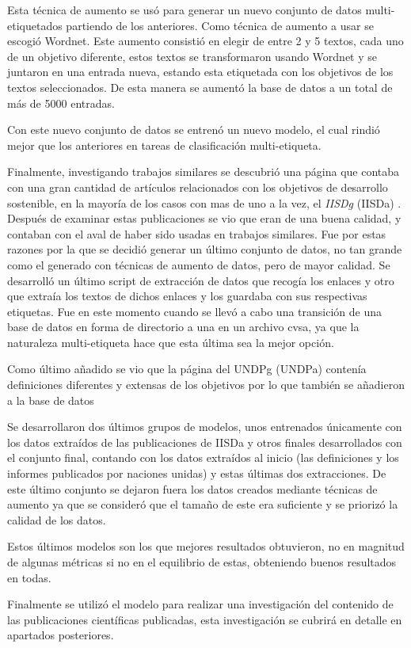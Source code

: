 Esta técnica de aumento se usó para generar un nuevo conjunto de datos
multi-etiquetados partiendo de los anteriores. Como técnica de aumento a usar se
escogió Wordnet. Este aumento consistió en elegir de entre 2 y 5 textos, cada
uno de un objetivo diferente, estos textos se transformaron usando Wordnet y se
juntaron en una entrada nueva, estando esta etiquetada con los objetivos de los
textos seleccionados. De esta manera se aumentó la base de datos a un total de
más de 5000 entradas. 

Con este nuevo conjunto de datos se entrenó un nuevo modelo, el cual rindió mejor que los anteriores en tareas de clasificación multi-etiqueta. 

Finalmente, investigando trabajos similares se descubrió una página que contaba
con una gran cantidad de artículos relacionados con los objetivos de desarrollo
sostenible, en la mayoría de los casos con mas de uno a la vez, el \textit{\gls{IISDg} }(\gls{IISDa})
\cite{IISDHomepage}. Después de examinar estas publicaciones se vio que eran
de una buena calidad, y contaban con el aval de haber sido usadas en trabajos
similares. Fue por estas razones por la que se decidió generar un último
conjunto de datos, no tan grande como el generado con técnicas de aumento de
datos, pero de mayor calidad. Se desarrolló un último script de extracción de
datos que recogía los enlaces y otro que extraía los textos de dichos enlaces y
los guardaba con sus respectivas etiquetas. Fue en este momento cuando se
llevó a cabo una transición de una base de datos en forma de directorio a una en un
archivo \gls{cvsa}, ya que la naturaleza multi-etiqueta hace que esta última sea la
mejor opción. 

Como último añadido se vio que la página del \gls{UNDPg} (\gls{UNDPa}) \cite{UNDPHomepage} contenía
definiciones diferentes y extensas de los objetivos por lo que también se
añadieron a la base de datos

Se desarrollaron dos últimos grupos de modelos, unos entrenados únicamente con
los datos extraídos de las publicaciones de \gls{IISDa} y
otros finales desarrollados con el conjunto final, contando con los datos
extraídos al inicio (las definiciones y los informes publicados por naciones
unidas) y estas últimas dos extracciones. De este último conjunto se dejaron
fuera los datos creados mediante técnicas de aumento ya que se consideró que el
tamaño de este era suficiente y se priorizó la calidad de los datos. 

Estos últimos modelos son los que mejores resultados obtuvieron, no en magnitud
de algunas métricas si no en el equilibrio de estas, obteniendo buenos
resultados en todas. 

Finalmente se utilizó el modelo para realizar una investigación del contenido de
las publicaciones científicas publicadas, esta investigación se cubrirá en
detalle en apartados posteriores. 

